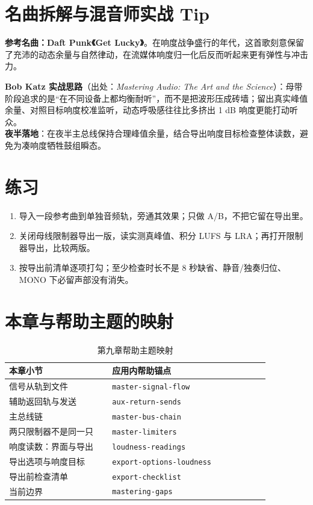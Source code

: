 \section{名曲拆解与混音师实战 Tip}

\textbf{参考名曲：Daft Punk《Get Lucky》}。在响度战争盛行的年代，这首歌刻意保留了充沛的动态余量与自然律动，在流媒体响度归一化后反而听起来更有弹性与冲击力。

\begin{tipbox}
\textbf{Bob Katz 实战思路}（出处：\emph{Mastering Audio: The Art and the Science}）：母带阶段追求的是“在不同设备上都均衡耐听”，而不是把波形压成砖墙；留出真实峰值余量、对照目标响度校准监听，动态呼吸感往往比多挤出 1 dB 响度更能打动听众。\\
\textbf{夜半落地}：在夜半主总线保持合理峰值余量，结合导出响度目标检查整体读数，避免为凑响度牺牲鼓组瞬态。
\end{tipbox}

\section{练习}


\begin{exercise}
\begin{enumerate}
  \item 导入一段参考曲到单独音频轨，旁通其效果；只做 A/B，不把它留在导出里。
  \item 关闭母线限制器导出一版，读实测真峰值、积分 LUFS 与 LRA；再打开限制器导出，比较两版。
  \item 按导出前清单逐项打勾；至少检查时长不是 8 秒缺省、静音/独奏归位、MONO 下必留声部没有消失。
\end{enumerate}
\end{exercise}

\section{本章与帮助主题的映射}

\begin{table}[htbp]
\centering
\small
\begin{tabular}{@{}p{0.34\linewidth}p{0.52\linewidth}@{}}
\hline
本章小节 & 应用内帮助锚点 \\
\hline
信号从轨到文件 & \texttt{master-signal-flow} \\
辅助返回轨与发送 & \texttt{aux-return-sends} \\
主总线链 & \texttt{master-bus-chain} \\
两只限制器不是同一只 & \texttt{master-limiters} \\
响度读数：界面与导出 & \texttt{loudness-readings} \\
导出选项与响度目标 & \texttt{export-options-loudness} \\
导出前检查清单 & \texttt{export-checklist} \\
当前边界 & \texttt{mastering-gaps} \\
\hline
\end{tabular}
\caption{第九章帮助主题映射}
\label{tab:mastering-help-map}
\end{table}

